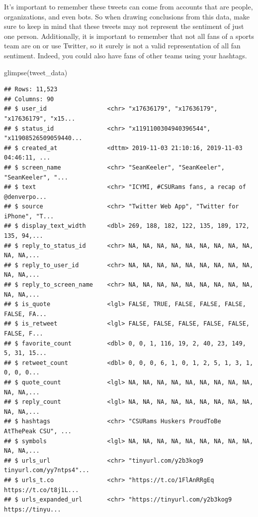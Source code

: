 \documentclass[
]{book}
\newenvironment{Shaded}{\begin{snugshade}}{\end{snugshade}}
\newcommand{\FunctionTok}[1]{\textcolor[rgb]{0.00,0.00,0.00}{#1}}
\newcommand{\NormalTok}[1]{#1}
\begin{document}
It's important to remember these tweets can come from accounts that are people, organizations, and even bots. So when drawing conclusions from this data, make sure to keep in mind that these tweets may not represent the sentiment of just one person. Additionally, it is important to remember that not all fans of a sports team are on or use Twitter, so it surely is not a valid representation of all fan sentiment. Indeed, you could also have fans of other teams using your hashtags.

\begin{Shaded}
\begin{Highlighting}[]
\FunctionTok{glimpse}\NormalTok{(tweet\_data)}
\end{Highlighting}
\end{Shaded}

\begin{verbatim}
## Rows: 11,523
## Columns: 90
## $ user_id                 <chr> "x17636179", "x17636179", "x17636179", "x15...
## $ status_id               <chr> "x1191100304940396544", "x11908526509059440...
## $ created_at              <dttm> 2019-11-03 21:10:16, 2019-11-03 04:46:11, ...
## $ screen_name             <chr> "SeanKeeler", "SeanKeeler", "SeanKeeler", "...
## $ text                    <chr> "ICYMI, #CSURams fans, a recap of @denverpo...
## $ source                  <chr> "Twitter Web App", "Twitter for iPhone", "T...
## $ display_text_width      <dbl> 269, 188, 182, 122, 135, 189, 172, 135, 94,...
## $ reply_to_status_id      <chr> NA, NA, NA, NA, NA, NA, NA, NA, NA, NA, NA,...
## $ reply_to_user_id        <chr> NA, NA, NA, NA, NA, NA, NA, NA, NA, NA, NA,...
## $ reply_to_screen_name    <chr> NA, NA, NA, NA, NA, NA, NA, NA, NA, NA, NA,...
## $ is_quote                <lgl> FALSE, TRUE, FALSE, FALSE, FALSE, FALSE, FA...
## $ is_retweet              <lgl> FALSE, FALSE, FALSE, FALSE, FALSE, FALSE, F...
## $ favorite_count          <dbl> 0, 0, 1, 116, 19, 2, 40, 23, 149, 5, 31, 15...
## $ retweet_count           <dbl> 0, 0, 0, 6, 1, 0, 1, 2, 5, 1, 3, 1, 0, 0, 0...
## $ quote_count             <lgl> NA, NA, NA, NA, NA, NA, NA, NA, NA, NA, NA,...
## $ reply_count             <lgl> NA, NA, NA, NA, NA, NA, NA, NA, NA, NA, NA,...
## $ hashtags                <chr> "CSURams Huskers ProudToBe AtThePeak CSU", ...
## $ symbols                 <lgl> NA, NA, NA, NA, NA, NA, NA, NA, NA, NA, NA,...
## $ urls_url                <chr> "tinyurl.com/y2b3kog9 tinyurl.com/yy7ntps4"...
## $ urls_t.co               <chr> "https://t.co/1FlAnRRgEq https://t.co/t8j1L...
## $ urls_expanded_url       <chr> "https://tinyurl.com/y2b3kog9 https://tinyu...

\end{verbatim}
\end{document}
